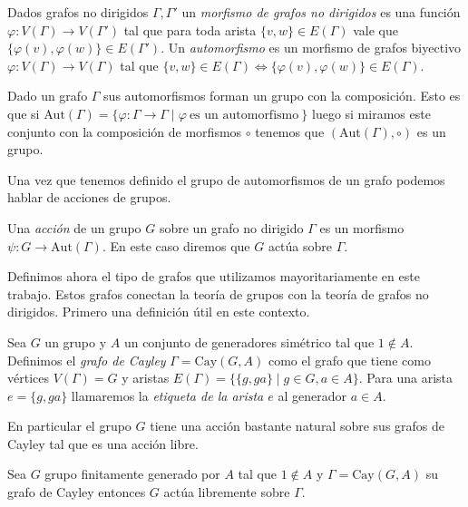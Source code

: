 \documentclass[tesis.tex]{subfiles}
\begin{document}
\begin{deff}
	Dados grafos no dirigidos $\Gamma, \Gamma'$ un \emph{morfismo de grafos no dirigidos} es una función $\varphi:V(\Gamma) \to V(\Gamma')$ tal que para toda arista $\{ v,w \} \in E(\Gamma)$ vale que $\{  \varphi(v), \varphi(w) \} \in E(\Gamma')$.
	Un \emph{automorfismo} es un morfismo de grafos biyectivo $\varphi: V(\Gamma) \to V(\Gamma)$ tal que 
	$\{ v,w \} \in E(\Gamma) \iff \{ \varphi(v), \varphi(w) \} \in E(\Gamma)$. 
\end{deff}

Dado un grafo $\Gamma$ sus automorfismos forman un grupo con la composición.
Esto es que si $\text{Aut}(\Gamma) = \{ \varphi: \Gamma \to \Gamma  \mid \varphi \ \text{es un automorfismo} \  \}$ luego si miramos este conjunto con la composición de morfismos $\circ$ tenemos que $(\text{Aut}(\Gamma), \circ)$ es un grupo.

Una vez que tenemos definido el grupo de automorfismos de un grafo podemos hablar de acciones de grupos.

\begin{deff}
	Una \emph{acción} de un grupo $G$ sobre un grafo no dirigido $\Gamma$ es un morfismo $\psi:G \to \text{Aut}(\Gamma)$.
	En este caso diremos que $G$ actúa sobre $\Gamma$.
\end{deff}




Definimos ahora el tipo de grafos que utilizamos mayoritariamente en este trabajo.
Estos grafos conectan la teoría de grupos con la teoría de grafos no dirigidos.
Primero una definición útil en este contexto.


\begin{deff}
	Sea $G$ un grupo y $A$ un conjunto de generadores simétrico tal que $1 \notin A$.
	Definimos el \emph{grafo de Cayley} $\Gamma = \text{Cay}(G,A)$ como el grafo que tiene como vértices $V(\Gamma) = G$ y aristas $E(\Gamma) = \{ \{g,ga \} \mid g \in G, a \in A \}$.
	Para una arista $e = \{g,ga\}$ llamaremos la \emph{etiqueta de la arista $e$} al generador $a \in A$.
\end{deff}


En particular el grupo $G$ tiene una acción bastante natural sobre sus grafos de Cayley tal que es una acción libre.

\begin{lema}\label{lema_grp_acc_libre_cayley}
	Sea $G$ grupo finitamente generado por $A$ tal que $1 \notin A$ y $\Gamma = \text{Cay}(G,A)$ su grafo de Cayley entonces $G$ actúa libremente sobre $\Gamma$.
\end{lema}
\end{document}

